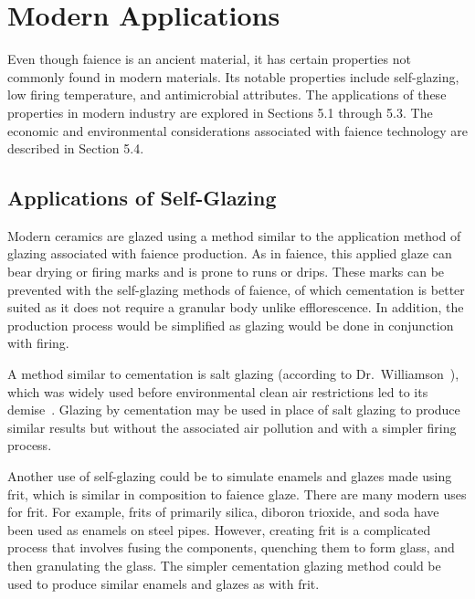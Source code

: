 \chapter{Modern Applications}


Even though faience is an ancient material, it has certain properties not commonly found in modern materials. Its notable properties include self-glazing, low firing temperature, and antimicrobial attributes. The applications of these properties in modern industry are explored in Sections 5.1 through 5.3. The economic and environmental considerations associated with faience technology are described in Section 5.4.


\section{Applications of Self-Glazing}

Modern ceramics are glazed using a method similar to the application method of glazing associated with faience production. As in faience, this applied glaze can bear drying or firing marks and is prone to runs or drips. These marks can be prevented with the self-glazing methods of faience, of which cementation is better suited as it does not require a granular body unlike efflorescence. In addition, the production process would be simplified as glazing would be done in conjunction with firing.

A method similar to cementation is salt glazing (according to Dr.\ Williamson~\cite{vandiver83}), which was widely used before environmental clean air restrictions led to its demise~\cite{dodd94}. Glazing by cementation may be used in place of salt glazing to produce similar results but without the associated air pollution and with a simpler firing process.

Another use of self-glazing could be to simulate enamels and glazes made using frit, which is similar in composition to faience glaze. There are many modern uses for frit. For example, frits of primarily silica, diboron trioxide, and soda have been used as enamels on steel pipes. However, creating frit is a complicated process that involves fusing the components, quenching them to form glass, and then granulating the glass. The simpler cementation glazing method could be used to produce similar enamels and glazes as with frit.

